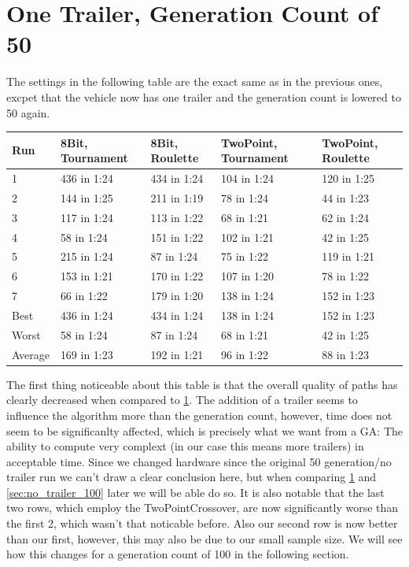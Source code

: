 \section{One Trailer, Generation Count of 50}
\label{sec:no_trailer_50}

The settings in the following table are the exact same as in the previous ones, excpet that the vehicle now has one trailer and the generation count is lowered to 50 again.

\begin{center}
	\begin{tabular}{| l | l | l | p{3cm} | p{3cm}|}
		\hline
		Run 		& 8Bit, Tournament 	& 8Bit, Roulette 	& TwoPoint, Tournament 	& TwoPoint, Roulette	\\ \hline
		1				&	436 in 1:24				&	434 in 1:24			&	104 in 1:24						&	120 in 1:25					\\ \hline
		2				&	144 in 1:25				&	211 in 1:19			&	78 in 1:24						&	44 in 1:23					\\ \hline
		3				&	117 in 1:24				&	113 in 1:22			&	68 in 1:21						&	62 in 1:24					\\ \hline
		4				&	58 in 1:24				&	151 in 1:22			&	102 in 1:21						&	42 in 1:25					\\ \hline
		5				&	215 in 1:24				&	87 in 1:24			&	75 in 1:22						&	119 in 1:21					\\ \hline
		6				&	153 in 1:21				&	170 in 1:22			&	107 in 1:20						&	78 in 1:22					\\ \hline
		7				&	66 in 1:22				&	179 in 1:20			&	138 in 1:24						&	152 in 1:23					\\ \hline
		Best		&	436 in 1:24				&	434 in 1:24			&	138 in 1:24						&	152 in 1:23					\\ \hline
		Worst		&	58 in 1:24				&	87 in 1:24			&	68 in 1:21						& 42 in 1:25					\\ \hline
		Average	&	169 in 1:23				& 192 in 1:21			& 96 in 1:22						&	88 in 1:23					\\ \hline
		\hline
	\end{tabular}
\end{center}

The first thing noticeable about this table is that the overall quality of paths has clearly decreased when compared to \ref{sec:no_trailer_50}. The addition of a trailer seems to influence the algorithm more than the generation count, however, time does not seem to be significanlty affected, which is precisely what we want from a GA: The ability to compute very complext (in our case this means more trailers) in acceptable time. Since we changed hardware since the original 50 generation/no trailer run we can't draw a clear conclusion here, but when comparing \ref{sec:no_trailer_50} and \ref{sec:no_trailer_100} later we will be able do so. It is also notable that the last two rows, which employ the TwoPointCrossover, are now significantly worse than the first 2, which wasn't that noticable before. Also our second row is now better than our first, however, this may also be due to our small sample size. We will see how this changes for a generation count of 100 in the following section.

